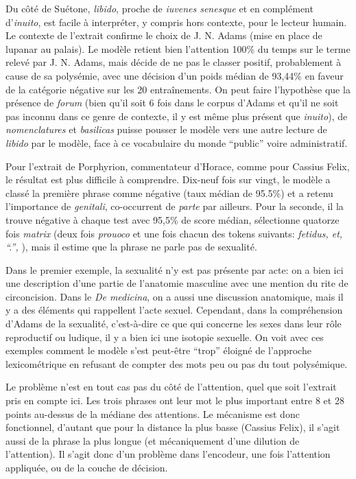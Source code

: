 Du côté de Suétone, \textit{libido}, proche de \textit{iuvenes senesque} et en complément d'\textit{inuito}, est facile à interpréter, y compris hors contexte, pour le lecteur humain. Le contexte de l'extrait confirme le choix de J. N. Adams (mise en place de lupanar au palais). Le modèle retient bien l'attention 100\% du temps sur le terme relevé par J. N. Adams, mais décide de ne pas le classer positif, probablement à cause de sa polysémie, avec une décision d'un poids médian de 93,44\% en faveur de la catégorie négative sur les 20 entraînements. On peut faire l'hypothèse que la présence de \textit{forum} (bien qu'il soit 6 fois dans le corpus d'Adams et qu'il ne soit pas inconnu dans ce genre de contexte, il y est même plus présent que \textit{inuito}), de \textit{nomenclatures} et \textit{basilicas} puisse pousser le modèle vers une autre lecture de \textit{libido} par le modèle, face à ce vocabulaire du monde \enquote{public} voire administratif.

Pour l'extrait de Porphyrion, commentateur d'Horace, comme pour Cassius Felix, le résultat est plus difficile à comprendre. Dix-neuf fois sur vingt, le modèle a classé la première phrase comme négative  (taux médian de 95.5\%) et a retenu l'importance de \textit{genitali}, co-occurrent de \textit{parte} par ailleurs. Pour la seconde, il la trouve négative à chaque test avec 95,5\% de score médian, sélectionne quatorze fois \textit{matrix} (deux fois \textit{prouoco} et une fois chacun des tokens suivants: \textit{fetidus, et, \enquote{.}, }), mais il estime que la phrase ne parle pas de sexualité.

Dans le premier exemple, la sexualité n'y est pas présente par acte: on a bien ici une description d'une partie de l'anatomie masculine avec une mention du rite de circoncision. Dans le \textit{De medicina}, on a aussi une discussion anatomique, mais il y a des éléments qui rappellent l'acte sexuel. Cependant, dans la compréhension d'Adams de la sexualité, c'est-à-dire ce que qui concerne les sexes dans leur rôle reproductif ou ludique, il y a bien ici une isotopie sexuelle. On voit avec ces exemples comment le modèle s'est peut-être \enquote{trop} éloigné de l'approche lexicométrique en refusant de compter des mots peu ou pas du tout polysémique.

Le problème n'est en tout cas pas du côté de l'attention, quel que soit l'extrait pris en compte ici. Les trois phrases ont leur mot le plus important entre 8 et 28 points au-dessus de la médiane des attentions. Le mécanisme est donc fonctionnel, d'autant que pour la distance la plus basse (Cassius Felix), il s'agit aussi de la phrase la plus longue (et mécaniquement d'une dilution de l'attention). Il s'agit donc d'un problème dans l'encodeur, une fois l'attention appliquée, ou de la couche de décision.

